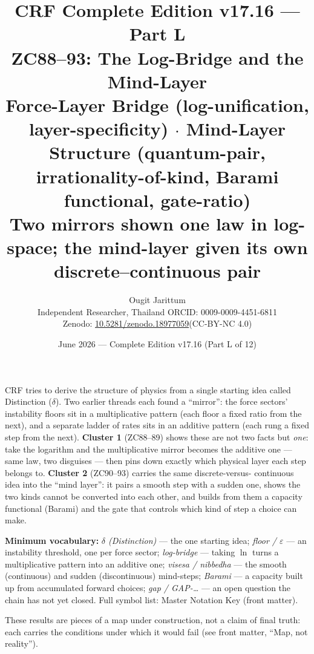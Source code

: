 \documentclass[12pt, a4paper]{article}
\title{%
  \textbf{\color{deepblue}CRF Complete Edition v17.16 --- Part L}\\[0.4em]
  \large ZC88--93: The Log-Bridge and the Mind-Layer\\[0.2em]
  \normalsize\color{mutedgray}
  Force-Layer Bridge (log-unification, layer-specificity) $\cdot$
  Mind-Layer Structure (quantum-pair, irrationality-of-kind,
  Barami functional, gate-ratio)\\[0.2em]
  \textbf{\color{crfgreen}Two mirrors shown one law in log-space;
  the mind-layer given its own discrete--continuous pair}
}
\author{Ougit Jarittum\\
\small Independent Researcher, Thailand\quad
ORCID: 0009-0009-4451-6811\\
\small Zenodo: \href{https://doi.org/10.5281/zenodo.18977059}%
{10.5281/zenodo.18977059}\quad (CC-BY-NC 4.0)
}
\date{June 2026 --- Complete Edition v17.16 (Part L of 12)}
\begin{document}
\sloppy


\maketitle
\tableofcontents
\newpage

\begin{keybox}[title={If you are just arriving --- Part L in plain language}]
\sloppy
CRF tries to derive the structure of physics from a single starting idea
called Distinction ($\delta$). Two earlier threads each found a ``mirror'':
the force sectors' instability floors sit in a multiplicative pattern (each
floor a fixed ratio from the next), and a separate ladder of rates sits in
an additive pattern (each rung a fixed step from the next). \textbf{Cluster
1} (ZC88--89) shows these are not two facts but \emph{one}: take the
logarithm and the multiplicative mirror becomes the additive one --- same
law, two disguises --- then pins down exactly which physical layer each step
belongs to. \textbf{Cluster 2} (ZC90--93) carries the same discrete-versus-
continuous idea into the ``mind layer'': it pairs a smooth step with a
sudden one, shows the two kinds cannot be converted into each other, and
builds from them a capacity functional (Barami) and the gate that controls
which kind of step a choice can make.

\textbf{Minimum vocabulary:}
\textit{$\delta$ (Distinction)} --- the one starting idea;\;
\textit{floor / $\varepsilon$} --- an instability threshold, one per force
sector;\;
\textit{log-bridge} --- taking $\ln$ turns a multiplicative pattern into an
additive one;\;
\textit{visesa / nibbedha} --- the smooth (continuous) and sudden
(discontinuous) mind-steps;\;
\textit{Barami} --- a capacity built up from accumulated forward choices;\;
\textit{gap / GAP-\dots} --- an open question the chain has not yet closed.
Full symbol list: Master Notation Key (front matter).

These results are pieces of a map under construction, not a claim of final
truth: each carries the conditions under which it would fail (see front
matter, ``Map, not reality'').
\end{keybox}

\newpage
\end{document}
